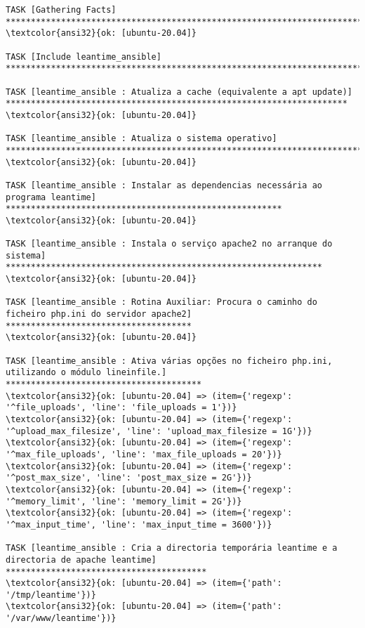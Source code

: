 \documentclass{scrartcl}
\begin{document}
\begin{Verbatim}
TASK [Gathering Facts] *******************************************************************************************************************
\textcolor{ansi32}{ok: [ubuntu-20.04]}

TASK [Include leantime_ansible] **********************************************************************************************************

TASK [leantime_ansible : Atualiza a cache (equivalente a apt update)] ********************************************************************
\textcolor{ansi32}{ok: [ubuntu-20.04]}

TASK [leantime_ansible : Atualiza o sistema operativo] ***********************************************************************************
\textcolor{ansi32}{ok: [ubuntu-20.04]}

TASK [leantime_ansible : Instalar as dependencias necessária ao programa leantime] *******************************************************
\textcolor{ansi32}{ok: [ubuntu-20.04]}

TASK [leantime_ansible : Instala o serviço apache2 no arranque do sistema] ***************************************************************
\textcolor{ansi32}{ok: [ubuntu-20.04]}

TASK [leantime_ansible : Rotina Auxiliar: Procura o caminho do ficheiro php.ini do servidor apache2] *************************************
\textcolor{ansi32}{ok: [ubuntu-20.04]}

TASK [leantime_ansible : Ativa várias opções no ficheiro php.ini, utilizando o módulo lineinfile.] ***************************************
\textcolor{ansi32}{ok: [ubuntu-20.04] => (item={'regexp': '^file_uploads', 'line': 'file_uploads = 1'})}
\textcolor{ansi32}{ok: [ubuntu-20.04] => (item={'regexp': '^upload_max_filesize', 'line': 'upload_max_filesize = 1G'})}
\textcolor{ansi32}{ok: [ubuntu-20.04] => (item={'regexp': '^max_file_uploads', 'line': 'max_file_uploads = 20'})}
\textcolor{ansi32}{ok: [ubuntu-20.04] => (item={'regexp': '^post_max_size', 'line': 'post_max_size = 2G'})}
\textcolor{ansi32}{ok: [ubuntu-20.04] => (item={'regexp': '^memory_limit', 'line': 'memory_limit = 2G'})}
\textcolor{ansi32}{ok: [ubuntu-20.04] => (item={'regexp': '^max_input_time', 'line': 'max_input_time = 3600'})}

TASK [leantime_ansible : Cria a directoria temporária leantime e a directoria de apache leantime] ****************************************
\textcolor{ansi32}{ok: [ubuntu-20.04] => (item={'path': '/tmp/leantime'})}
\textcolor{ansi32}{ok: [ubuntu-20.04] => (item={'path': '/var/www/leantime'})}


\end{Verbatim}
\end{document}
